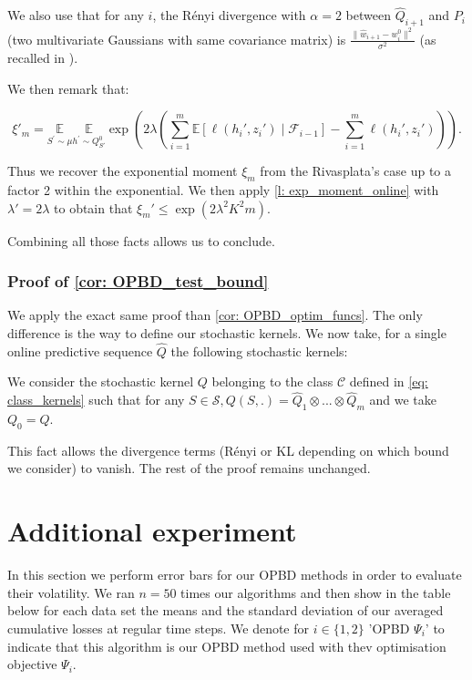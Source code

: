 We also use that for any $i$, the Rényi divergence with $\alpha=2$ between $\hat{Q}_{i+1}$ and $P_i$ (two multivariate Gaussians with same covariance matrix) is $\frac{\|\hat{w}_{i+1}- w_i^0\|^2}{\sigma^2}$ (as recalled in \cite{gil2013renyi}).

We then remark that:

\[ \xi'_m = \underset{S^{\prime} \sim \mu}{\mathbb{E}} \underset{h^{\prime} \sim Q_{S'}^0}{\mathbb{E}}
\exp\left(2\lambda \left(\sum_{i=1}^m \mathbb{E}\left[\ell(h_i',z_i')\mid \mathcal{F}_{i-1}\right]- \sum_{i=1}^m \ell(h_i',z_i') \right)\right).  \]

Thus we recover the exponential moment $\xi_m$ from the Rivasplata's case up to a factor 2 within the exponential. We then apply \cref{l: exp_moment_online} with $\lambda'= 2\lambda$ to obtain that $\xi_m'\leq \exp\left(  2\lambda^2K^2m \right)$.


Combining all those facts allows us to conclude.




\subsubsection{Proof of \cref{cor: OPBD_test_bound}}

We apply the exact same proof than \cref{cor: OPBD_optim_funcs}. The only difference is the way to define our stochastic kernels. We now take, for a single online predictive sequence $\hat{Q}$ the following stochastic kernels:

We consider the stochastic kernel $Q$ belonging to the class $\mathcal{C}$ defined in \cref{eq: class_kernels} such that for any $S\in\mathcal{S}, Q(S,.) = \hat{Q}_1\otimes ... \otimes \hat{Q}_{m}$ and we take $Q_0=Q$.

This fact allows the divergence terms (Rényi or KL depending on which bound we consider) to vanish. The rest of the proof remains unchanged.


\section{Additional experiment}
\label{sec: error_bars}

In this section we perform error bars for our OPBD methods in order to evaluate their volatility.
We ran $n=50$ times our algorithms and then show in the table below for each data set the means and the standard deviation of our averaged cumulative losses at regular time steps. We denote for $i\in\{1,2\}$ 'OPBD $\Psi_i$' to indicate that this algorithm is our OPBD method used with thev optimisation objective $\Psi_i$.


